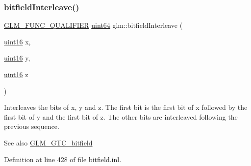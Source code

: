\mbox{\label{group__gtc__bitfield_ga3c170e2ec54f2faab5e1c5bb693d718d}} 
\subsubsection{\texorpdfstring{bitfieldInterleave()}{bitfieldInterleave()}\hspace{0.1cm}{\footnotesize\ttfamily [10/16]}}
{\footnotesize\ttfamily \mbox{\hyperlink{setup_8hpp_a33fdea6f91c5f834105f7415e2a64407}{G\+L\+M\+\_\+\+F\+U\+N\+C\+\_\+\+Q\+U\+A\+L\+I\+F\+I\+ER}} \mbox{\hyperlink{group__gtc__type__precision_gae3632bf9b37da66233d78930dd06378a}{uint64}} glm\+::bitfield\+Interleave (\begin{DoxyParamCaption}\item[{\mbox{\hyperlink{group__gtc__type__precision_gad8c2939e1fdd8e5828b31d95c52255d5}{uint16}}}]{x,  }\item[{\mbox{\hyperlink{group__gtc__type__precision_gad8c2939e1fdd8e5828b31d95c52255d5}{uint16}}}]{y,  }\item[{\mbox{\hyperlink{group__gtc__type__precision_gad8c2939e1fdd8e5828b31d95c52255d5}{uint16}}}]{z }\end{DoxyParamCaption})}

Interleaves the bits of x, y and z. The first bit is the first bit of x followed by the first bit of y and the first bit of z. The other bits are interleaved following the previous sequence.

\begin{DoxySeeAlso}{See also}
\mbox{\hyperlink{group__gtc__bitfield}{G\+L\+M\+\_\+\+G\+T\+C\+\_\+bitfield}} 
\end{DoxySeeAlso}


Definition at line 428 of file bitfield.\+inl.

\mbox{\label{group__gtc__bitfield_ga64e2d84f6560af3cc639644b1e628c42}} 
